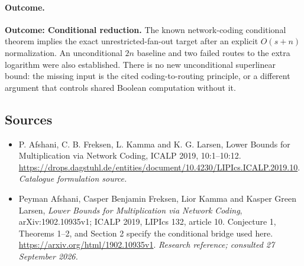 \documentclass[11pt,a4paper]{article}
\numberwithin{equation}{section}
\begin{document}
\paragraph{Outcome.}
\textbf{Outcome: Conditional reduction.}
The known network-coding conditional theorem implies the exact unrestricted-fan-out target after an explicit $O(s+n)$ normalization. An unconditional $2n$ baseline and two failed routes to the extra logarithm were also established. There is no new unconditional superlinear bound: the missing input is the cited coding-to-routing principle, or a different argument that controls shared Boolean computation without it.

\subsection{Sources}
\begin{itemize}\raggedright
\item[\textnormal{[S1]}]\hypertarget{source:statement:1}{} P. Afshani, C. B. Freksen, L. Kamma and K. G. Larsen, Lower Bounds for Multiplication via Network Coding, ICALP 2019, 10:1–10:12.
\url{https://drops.dagstuhl.de/entities/document/10.4230/LIPIcs.ICALP.2019.10}.
{\small\textit{Catalogue formulation source.}}
\item[\textnormal{[E1]}]\hypertarget{extra:statement:1}{} Peyman Afshani, Casper Benjamin Freksen, Lior Kamma and Kasper Green Larsen, \emph{Lower Bounds for Multiplication via Network Coding}, arXiv:1902.10935v1; ICALP 2019, LIPIcs 132, article 10. Conjecture 1, Theorems 1--2, and Section 2 specify the conditional bridge used here.
\url{https://arxiv.org/html/1902.10935v1}.
{\small\textit{Research reference; consulted 27 September 2026.}}
\end{itemize}
\end{document}
